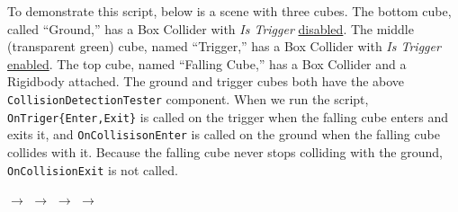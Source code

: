 \documentclass[11pt]{article}
\begin{document}
To demonstrate this script, below is a scene with three cubes.  The bottom cube, called ``Ground,''
has a Box Collider with \textit{Is Trigger} \underline{disabled}.  The middle (transparent green) cube,
named ``Trigger,'' has a Box Collider with \textit{Is Trigger} \underline{enabled}.  The top cube, named ``Falling
Cube,'' has a Box Collider and a Rigidbody attached.  The ground and trigger cubes both have the above
\lstinline|CollisionDetectionTester| component.  When we run the script, \lstinline|OnTriger{Enter,Exit}|
is called on the trigger when the falling cube enters and exits it, and \lstinline|OnCollisisonEnter| 
is called on the ground when the falling cube collides with it.  Because the falling cube never
stops colliding with the ground, \lstinline|OnCollisionExit| is not called.

\begin{center}
 $\rightarrow$
 $\rightarrow$
 $\rightarrow$
 $\rightarrow$

\end{center}
\end{document}

